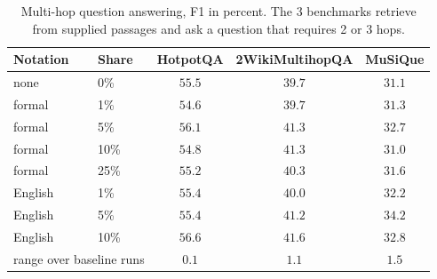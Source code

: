 \begin{table}[H]
\caption{Multi-hop question answering, F1 in percent. The 3 benchmarks retrieve from supplied passages and ask a question that requires 2 or 3 hops.}
\label{tab:multihop}
\begin{center}
\begin{tabular}{llccc}
\toprule
Notation & Share & HotpotQA & 2WikiMultihopQA & MuSiQue \\
\midrule
none    & 0\%  & $55.5$ & $39.7$ & $31.1$ \\
formal  & 1\%  & $54.6$ & $39.7$ & $31.3$ \\
formal  & 5\%  & $56.1$ & $41.3$ & $32.7$ \\
formal  & 10\% & $54.8$ & $41.3$ & $31.0$ \\
formal  & 25\% & $55.2$ & $40.3$ & $31.6$ \\
English & 1\%  & $55.4$ & $40.0$ & $32.2$ \\
English & 5\%  & $55.4$ & $41.2$ & $\mathbf{34.2}$ \\
English & 10\% & $\mathbf{56.6}$ & $\mathbf{41.6}$ & $32.8$ \\
\midrule
\multicolumn{2}{l}{range over baseline runs} & $0.1$ & $1.1$ & $1.5$ \\
\bottomrule
\end{tabular}
\end{center}
\end{table}
